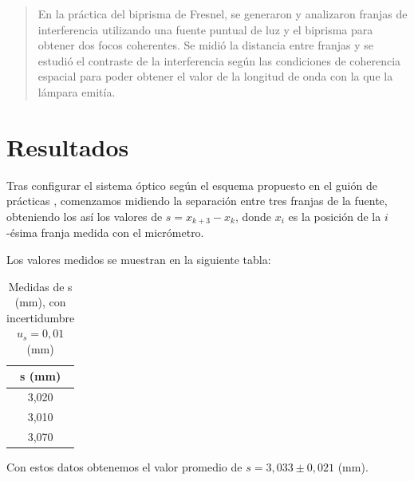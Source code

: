 \documentclass[10pt,onecolumn]{article}
\begin{document}

\tableofcontents %
\newpage

\HRule{0.5pt} %

\begin{abstract}
En la práctica del biprisma de Fresnel, se generaron y analizaron franjas de interferencia utilizando una fuente puntual de luz y el biprisma para obtener dos focos coherentes. Se midió la distancia entre franjas y se estudió el contraste de la interferencia según las condiciones de coherencia espacial para poder obtener el valor de la longitud de onda con la que la lámpara emitía.
\end{abstract}

\section{Resultados}
Tras configurar el sistema óptico según el esquema propuesto en el guión de prácticas \cite{InfoOpticaPrisma},
comenzamos midiendo la separación entre tres franjas de la fuente, obteniendo los así los valores de $s = x_{k+3} - x_k$, donde $x_i$ es la posición de la $i$-ésima franja medida con el micrómetro.

Los valores medidos se muestran en la siguiente tabla:
\begin{table}[H]
\centering
\begin{tabular}{|c|}
\hline
\rowcolor[rgb]{ .651,  .788,  .925}
\textbf{s (mm)} \\ \hline
\rowcolor[rgb]{.816,  .816,  .816} 3,020 \\ \hline
\rowcolor[rgb]{.816,  .816,  .816} 3,010 \\ \hline
\rowcolor[rgb]{.816,  .816,  .816} 3,070 \\ \hline
\end{tabular}
\caption{Medidas de s (mm), con incertidumbre $u_s=0,01$ (mm)}\label{tab:medidas_S}
\end{table}

Con estos datos obtenemos el valor promedio de $s=3,033\pm 0,021$ (mm).
\end{document}
